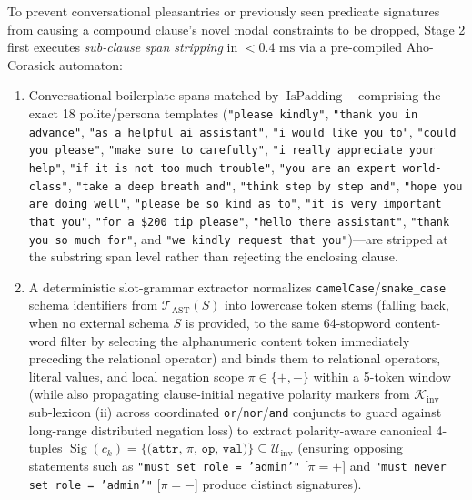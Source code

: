 \documentclass[conference,10pt]{IEEEtran}
\begin{document}
To prevent conversational pleasantries or previously seen predicate signatures from causing a compound clause's novel modal constraints to be dropped, Stage 2 first executes \textit{sub-clause span stripping} in $< 0.4\text{ ms}$ via a pre-compiled Aho-Corasick automaton:
\begin{enumerate}
    \item Conversational boilerplate spans matched by $\operatorname{IsPadding}$---comprising the exact 18 polite/persona templates (\texttt{"please kindly"}, \texttt{"thank you in advance"}, \texttt{"as a helpful ai assistant"}, \texttt{"i would like you to"}, \texttt{"could you please"}, \texttt{"make sure to carefully"}, \texttt{"i really appreciate your help"}, \texttt{"if it is not too much trouble"}, \texttt{"you are an expert world-class"}, \texttt{"take a deep breath and"}, \texttt{"think step by step and"}, \texttt{"hope you are doing well"}, \texttt{"please be so kind as to"}, \texttt{"it is very important that you"}, \texttt{"for a \$200 tip please"}, \texttt{"hello there assistant"}, \texttt{"thank you so much for"}, and \texttt{"we kindly request that you"})---are stripped at the substring span level rather than rejecting the enclosing clause.
    \item A deterministic slot-grammar extractor normalizes \texttt{camelCase}/\texttt{snake\_case} schema identifiers from $\mathcal{T}_{\text{AST}}(S)$ into lowercase token stems (falling back, when no external schema $S$ is provided, to the same 64-stopword content-word filter by selecting the alphanumeric content token immediately preceding the relational operator) and binds them to relational operators, literal values, and local negation scope $\pi \in \{+, -\}$ within a 5-token window (while also propagating clause-initial negative polarity markers from $\mathcal{K}_{\text{inv}}$ sub-lexicon (ii) across coordinated \texttt{or}/\texttt{nor}/\texttt{and} conjuncts to guard against long-range distributed negation loss) to extract polarity-aware canonical 4-tuples $\operatorname{Sig}(c_k) = \{\texttt{(attr, }\pi\texttt{, op, val)}\} \subseteq \mathcal{U}_{\text{inv}}$ (ensuring opposing statements such as \texttt{"must set role = 'admin'"} [$\pi=+$] and \texttt{"must never set role = 'admin'"} [$\pi=-$] produce distinct signatures).

\end{enumerate}
\end{document}
